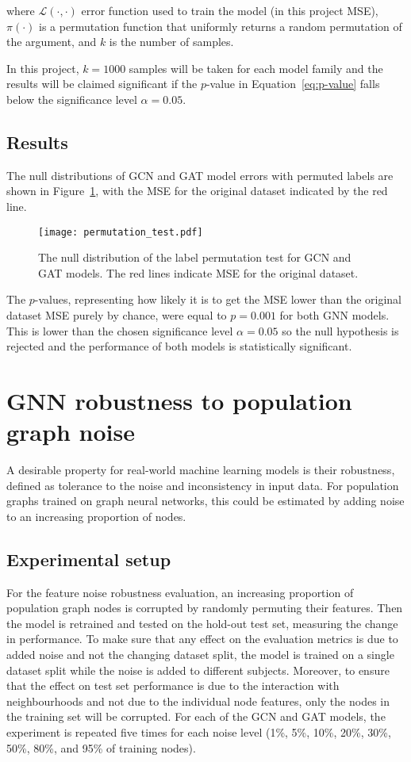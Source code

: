 where $\mathcal{L}(\cdot, \cdot)$ error function used to train the model (in this project MSE), $\pi(\cdot)$ is a permutation function that uniformly returns a random permutation of the argument, and $k$ is the number of samples.

In this project, $k=1000$ samples will be taken for each model family and the results will be claimed significant if the $p$-value in Equation~\eqref{eq:p-value} falls below the significance level $\alpha=0.05$. 

\subsection{Results}
The null distributions of GCN and GAT model errors with permuted labels are shown in Figure~\ref{figure:permutation-test}, with the MSE for the original dataset indicated by the red line.

\begin{figure}[h]
    \centering
    \texttt{[image: permutation\_test.pdf]}
    \caption{The null distribution of the label permutation test for GCN and GAT models. The red lines indicate MSE for the original dataset.}\label{figure:permutation-test}
\end{figure}

The $p$-values, representing how likely it is to get the MSE lower than the original dataset MSE purely by chance, were equal to $p=0.001$ for both GNN models. This is lower than the chosen significance level $\alpha=0.05$ so the null hypothesis is rejected and the performance of both models is statistically significant.


\section{GNN robustness to population graph noise}
\label{section:node-noise}
A desirable property for real-world machine learning models is their robustness, defined as tolerance to the noise and inconsistency in input data.
For population graphs trained on graph neural networks, this could be estimated by adding noise to an increasing proportion of nodes. 

\subsection{Experimental setup}
For the feature noise robustness evaluation, an increasing proportion of population graph nodes is corrupted by randomly permuting their features. Then the model is retrained and tested on the hold-out test set, measuring the change in performance. To make sure that any effect on the evaluation metrics is due to added noise and not the changing dataset split, the model is trained on a single dataset split while the noise is added to different subjects. Moreover, to ensure that the effect on test set performance is due to the interaction with neighbourhoods and not due to the individual node features, only the nodes in the training set will be corrupted. For each of the GCN and GAT models, the experiment is repeated five times for each noise level (1\%, 5\%, 10\%, 20\%, 30\%, 50\%, 80\%, and 95\% of training nodes).

